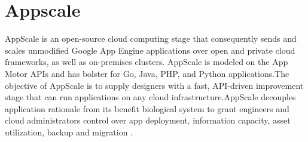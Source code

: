 \section{Appscale}
AppScale is an open-source cloud computing stage that consequently sends 
and scales unmodified Google App Engine applications over open and 
private cloud frameworks, as well as on-premises clusters. 
AppScale is modeled on the App Motor APIs and has bolster for Go, 
Java, PHP, and Python applications.The objective of AppScale is to 
supply designers with a fast, API-driven improvement stage that can 
run applications on any cloud infrastructure.AppScale decouples application 
rationale from its benefit biological system to grant engineers and 
cloud administrators control over app deployment, information capacity, 
asset utilization, backup and migration \cite{hid-sp18-412-wiki_appscale}.  

